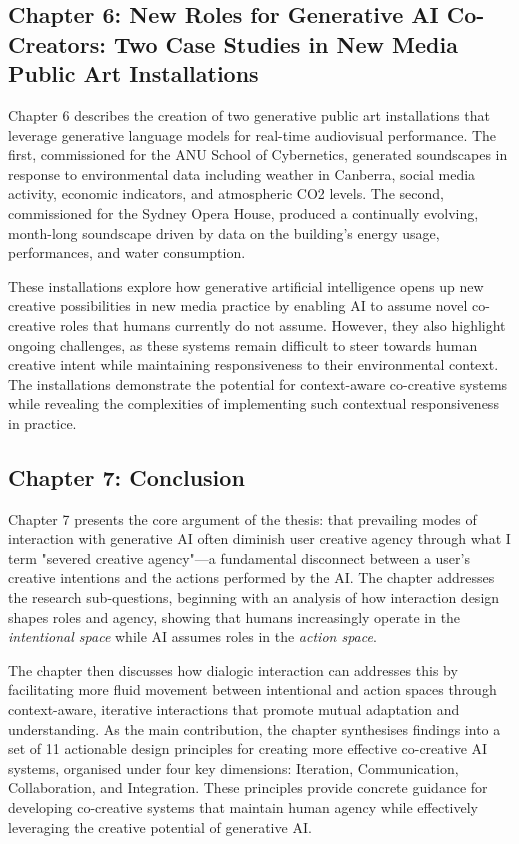 \subsection{Chapter 6: New Roles for Generative AI Co-Creators: Two Case Studies in New Media Public Art Installations}

Chapter 6 describes the creation of two generative public art installations that leverage generative language models for real-time audiovisual performance. The first, commissioned for the ANU School of Cybernetics, generated soundscapes in response to environmental data including weather in Canberra, social media activity, economic indicators, and atmospheric CO2 levels. The second, commissioned for the Sydney Opera House, produced a continually evolving, month-long soundscape driven by data on the building's energy usage, performances, and water consumption.

These installations explore how generative artificial intelligence opens up new creative possibilities in new media practice by enabling AI to assume novel co-creative roles that humans currently do not assume. However, they also highlight ongoing challenges, as these systems remain difficult to steer towards human creative intent while maintaining responsiveness to their environmental context. The installations demonstrate the potential for context-aware co-creative systems while revealing the complexities of implementing such contextual responsiveness in practice.

\subsection{Chapter 7: Conclusion}

Chapter 7 presents the core argument of the thesis: that prevailing modes of interaction with generative AI often diminish user creative agency through what I term "severed creative agency"—a fundamental disconnect between a user's creative intentions and the actions performed by the AI. The chapter addresses the research sub-questions, beginning with an analysis of how interaction design shapes roles and agency, showing that humans increasingly operate in the \textit{intentional space} while AI assumes roles in the \textit{action space}.

The chapter then discusses how dialogic interaction can addresses this by facilitating more fluid movement between intentional and action spaces through context-aware, iterative interactions that promote mutual adaptation and understanding. As the main contribution, the chapter synthesises findings into a set of 11 actionable design principles for creating more effective co-creative AI systems, organised under four key dimensions: Iteration, Communication, Collaboration, and Integration. These principles provide concrete guidance for developing co-creative systems that maintain human agency while effectively leveraging the creative potential of generative AI.

